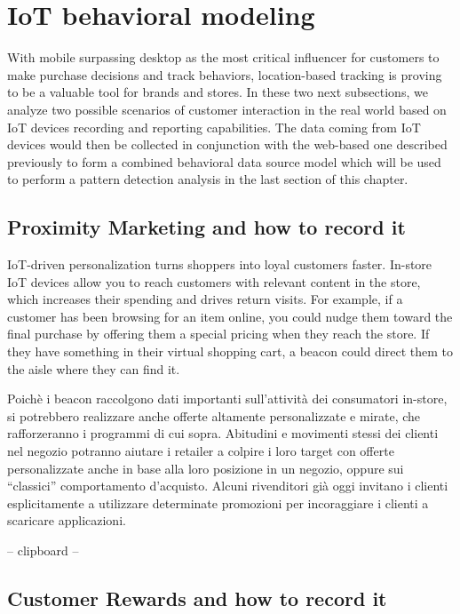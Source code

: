 \newpage
\section{IoT behavioral modeling}

With mobile surpassing desktop as the most critical influencer for customers to make purchase decisions and track behaviors, location-based tracking is proving to be a valuable tool for brands and stores.  In these two next subsections, we analyze two possible scenarios of customer interaction in the real world based on IoT devices recording and reporting capabilities. The data coming from IoT devices would then be collected in conjunction with the web-based one described previously to form a combined behavioral data source model which will be used to perform a pattern detection analysis in the last section of this chapter.

\subsection{Proximity Marketing and how to record it}




IoT-driven personalization turns shoppers into loyal customers faster. In-store IoT devices allow you to reach customers with relevant content in the store, which increases their spending and drives return visits. For example, if a customer has been browsing for an item online, you could nudge them toward the final purchase by offering them a special pricing when they reach the store. If they have something in their virtual shopping cart, a beacon could direct them to the aisle where they can find it.

Poichè i beacon raccolgono dati importanti sull’attività dei consumatori in-store, si potrebbero realizzare anche offerte altamente personalizzate e mirate, che rafforzeranno i programmi di cui sopra. Abitudini e movimenti stessi dei clienti nel negozio potranno aiutare i retailer a colpire i loro target con offerte personalizzate anche in base alla loro posizione in un negozio, oppure sui “classici” comportamento d’acquisto. Alcuni rivenditori già oggi invitano i clienti esplicitamente a utilizzare determinate promozioni per incoraggiare i clienti a scaricare applicazioni.

-- clipboard --

\subsection{Customer Rewards and how to record it}


